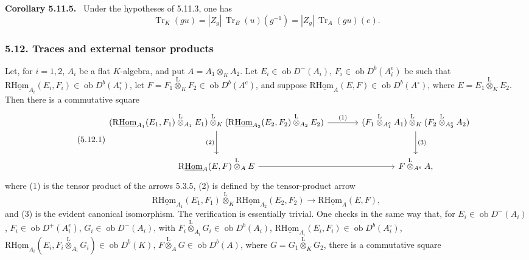 \documentclass[11pt]{article}
\newenvironment{statement}[1]{\par\medskip\noindent\textbf{#1.}\ }{\par\medskip}
\newcommand{\ob}{\operatorname{ob}}
\providecommand{\Tr}{\operatorname{Tr}}
\providecommand{\Tr}{\operatorname{Tr}}
\providecommand{\lten}{\overset{\mathrm L}{\otimes}}
\providecommand{\Tr}{\operatorname{Tr}}
\providecommand{\ob}{\operatorname{ob}}
\providecommand{\lten}{\overset{\mathrm L}{\otimes}}
\providecommand{\lten}{\overset{\mathrm L}{\otimes}}
\providecommand{\Tr}{\operatorname{Tr}}
\providecommand{\lten}{\overset{\mathrm L}{\otimes}}
\providecommand{\lten}{\overset{\mathrm L}{\otimes}}
\providecommand{\lten}{\overset{\mathrm L}{\otimes}}
\providecommand{\Tr}{\operatorname{Tr}}
\providecommand{\lten}{\overset{\mathrm L}{\otimes}}
\begin{document}
\begin{statement}{Corollary 5.11.5}
Under the hypotheses of 5.11.3, one has
\begin{equation}\tag{5.11.5}
\Tr_K(gu)=|Z_g|\,\Tr_B(u)(g^{-1})=|Z_g|\,\Tr_A(gu)(e).
\end{equation}
\end{statement}

\subsubsection*{5.12. Traces and external tensor products}

Let, for $i=1,2$, $A_i$ be a flat $K$-algebra, and put $A=A_1\otimes_KA_2$. Let $E_i\in\ob D^-(A_i)$, $F_i\in\ob D^b(A_i^e)$ be such that $\mathrm{R}\underline{\mathrm{Hom}}_{A_i}(E_i,F_i)\in\ob D^b(A_i^\circ)$, let $F=F_1\lten_KF_2\in\ob D^b(A^e)$, and suppose $\mathrm{R}\underline{\mathrm{Hom}}_A(E,F)\in\ob D^b(A^\circ)$, where $E=E_1\lten_KE_2$. Then there is a commutative square
\begin{equation}\tag{5.12.1}
\begin{tikzcd}[column sep=large,row sep=large]
(\mathrm{R}\underline{\mathrm{Hom}}_{A_1}(E_1,F_1)\lten_{A_1}E_1)\lten_K(\mathrm{R}\underline{\mathrm{Hom}}_{A_2}(E_2,F_2)\lten_{A_2}E_2) \arrow[r,"(1)"] \arrow[d,"(2)"'] & (F_1\lten_{A_1^e}A_1)\lten_K(F_2\lten_{A_2^e}A_2) \arrow[d,"(3)"]\\
\mathrm{R}\underline{\mathrm{Hom}}_A(E,F)\lten_AE \arrow[r] & F\lten_{A^e}A,
\end{tikzcd}
\end{equation}
where (1) is the tensor product of the arrows 5.3.5, (2) is defined by the tensor-product arrow
\begin{equation}\tag{5.12.2}
\mathrm{R}\underline{\mathrm{Hom}}_{A_1}(E_1,F_1)\lten_K\mathrm{R}\underline{\mathrm{Hom}}_{A_2}(E_2,F_2)\longrightarrow\mathrm{R}\underline{\mathrm{Hom}}_A(E,F),
\end{equation}
and (3) is the evident canonical isomorphism. The verification is essentially trivial. One checks in the same way that, for $E_i\in\ob D^-(A_i)$, $F_i\in\ob D^+(A_i^e)$, $G_i\in\ob D^-(A_i)$, with $F_i\lten_{A_i}G_i\in\ob D^b(A_i)$, $\mathrm{R}\underline{\mathrm{Hom}}_{A_i}(E_i,F_i)\in\ob D^b(A_i^\circ)$, $\mathrm{R}\underline{\mathrm{Hom}}_{A_i}(E_i,F_i\lten_{A_i}G_i)\in\ob D^b(K)$, $F\lten_AG\in\ob D^b(A)$, where $G=G_1\lten_KG_2$, there is a commutative square
\end{document}

